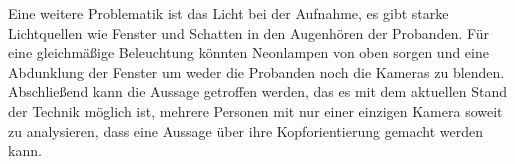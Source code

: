 Eine weitere Problematik ist das Licht bei der Aufnahme, es gibt starke Lichtquellen wie Fenster und Schatten in den Augenhören der Probanden. Für eine gleichmäßige Beleuchtung könnten Neonlampen von oben sorgen und eine Abdunklung der Fenster um weder die Probanden noch die Kameras zu blenden.\\
Abschließend kann die Aussage getroffen werden, das es mit dem aktuellen Stand der Technik möglich ist, mehrere Personen mit nur einer einzigen Kamera soweit zu analysieren, dass eine Aussage über ihre Kopforientierung gemacht werden kann.
